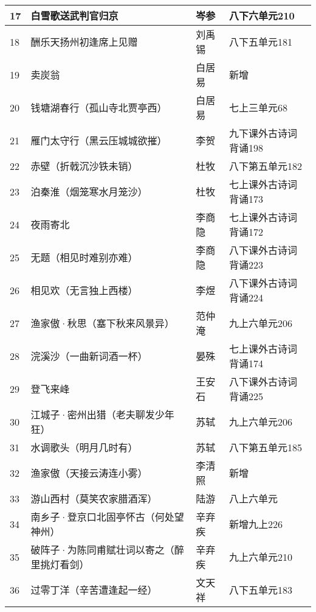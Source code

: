 \documentclass[12pt]{ctexart}
\begin{document}
\begin{longtable}{@{}llll@{}}
    17  & 白雪歌送武判官归京                 & 岑参     & 八下六单元210        \\* \midrule
    18  & 酬乐天扬州初逢席上见赠               & 刘禹锡    & 八下五单元181        \\* \midrule
    19  & 卖炭翁                       & 白居易    & 新增              \\* \midrule
    20  & 钱塘湖春行（孤山寺北贾亭西）            & 白居易    & 七上三单元68         \\* \midrule
    21  & 雁门太守行（黑云压城城欲摧）            & 李贺     & 九下课外古诗词背诵198    \\* \midrule
    22  & 赤壁（折戟沉沙铁未销）               & 杜牧     & 八下第五单元182       \\* \midrule
    23  & 泊秦淮（烟笼寒水月笼沙）              & 杜牧     & 七上课外古诗词背诵173    \\* \midrule
    24  & 夜雨寄北                      & 李商隐    & 七上课外古诗词背诵172    \\* \midrule
    25  & 无题（相见时难别亦难）               & 李商隐    & 八下课外古诗词背诵223    \\* \midrule
    26  & 相见欢（无言独上西楼）               & 李煜     & 八下课外古诗词背诵224    \\* \midrule
    27  & 渔家傲·秋思（塞下秋来风景异）           & 范仲淹    & 九上六单元206        \\* \midrule
    28  & 浣溪沙（一曲新词酒一杯）              & 晏殊     & 七上课外古诗词背诵174    \\* \midrule
    29  & 登飞来峰                      & 王安石    & 八下课外古诗词背诵225    \\* \midrule
    30  & 江城子·密州出猎（老夫聊发少年狂）         & 苏轼     & 九上六单元206        \\* \midrule
    31  & 水调歌头（明月几时有）               & 苏轼     & 八下第五单元185       \\* \midrule
    32  & 渔家傲（天接云涛连小雾）              & 李清照    & 新增              \\* \midrule
    33  & 游山西村（莫笑农家腊酒浑）             & 陆游     & 八上六单元           \\* \midrule
    34  & 南乡子·登京口北固亭怀古（何处望神州）       & 辛弃疾    & 新增九上226         \\* \midrule
    35  & 破阵子·为陈同甫赋壮词以寄之（醉里挑灯看剑）    & 辛弃疾    & 九上六单元210        \\* \midrule
    36  & 过零丁洋（辛苦遭逢起一经）             & 文天祥    & 八下五单元183        \\* \midrule

\end{longtable}
\end{document}

